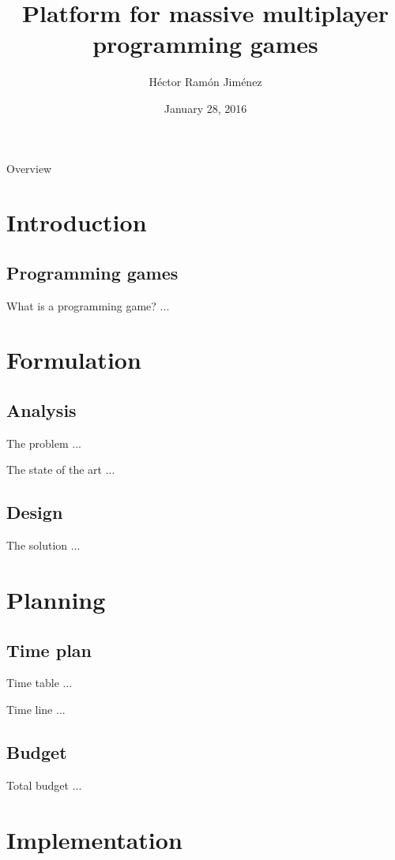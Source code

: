 \documentclass{beamer}
\title{Platform for massive multiplayer programming games}
\institute{Facultat d'Informàtica de Barcelona}
\author{Héctor Ramón Jiménez}
\date{January 28, 2016}
\begin{document}
\frame{\titlepage}
\begin{frame}{Overview}
\tableofcontents
\end{frame}
\section{Introduction}
\subsection{Programming games}
\begin{frame}{What is a programming game?}
...
\end{frame}
\section{Formulation}
\subsection{Analysis}
\begin{frame}{The problem}
...
\end{frame}
\begin{frame}{The state of the art}
...
\end{frame}
\subsection{Design}
\begin{frame}{The solution}
...
\end{frame}
\section{Planning}
\subsection{Time plan}
\begin{frame}{Time table}
...
\end{frame}
\begin{frame}{Time line}
...
\end{frame}
\subsection{Budget}
\begin{frame}{Total budget}
...
\end{frame}
\section{Implementation}
\end{document}
